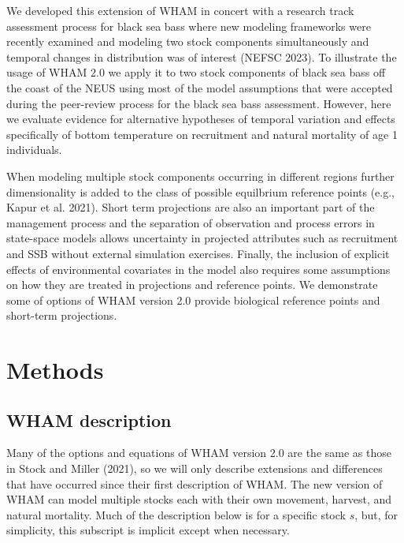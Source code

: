 \documentclass[
]{article}
\begin{document}
We developed this extension of WHAM in concert with a research track
assessment process for black sea bass where new modeling frameworks were
recently examined and modeling two stock components simultaneously and
temporal changes in distribution was of interest (NEFSC 2023). To
illustrate the usage of WHAM 2.0 we apply it to two stock components of
black sea bass off the coast of the NEUS using most of the model
assumptions that were accepted during the peer-review process for the
black sea bass assessment. However, here we evaluate evidence for
alternative hypotheses of temporal variation and effects specifically of
bottom temperature on recruitment and natural mortality of age 1
individuals.

When modeling multiple stock components occurring in different regions
further dimensionality is added to the class of possible equilbrium
reference points (e.g., Kapur et al. 2021). Short term projections are
also an important part of the management process and the separation of
observation and process errors in state-space models allows uncertainty
in projected attributes such as recruitment and SSB without external
simulation exercises. Finally, the inclusion of explicit effects of
environmental covariates in the model also requires some assumptions on
how they are treated in projections and reference points. We demonstrate
some of options of WHAM version 2.0 provide biological reference points
and short-term projections.

\hypertarget{methods}{%
\section*{Methods}\label{methods}}

\hypertarget{wham-description}{%
\subsection*{WHAM description}\label{wham-description}}

Many of the options and equations of WHAM version 2.0 are the same as
those in Stock and Miller (2021), so we will only describe extensions
and differences that have occurred since their first description of
WHAM. The new version of WHAM can model multiple stocks each with their
own movement, harvest, and natural mortality. Much of the description
below is for a specific stock \(s\), but, for simplicity, this subscript
is implicit except when necessary.
\end{document}
